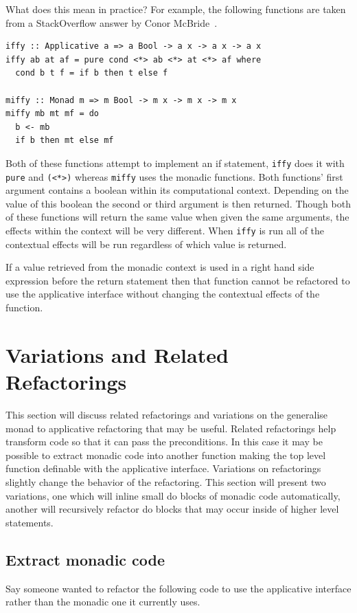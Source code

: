 What does this mean in practice? For example, the following functions are taken from a StackOverflow answer by Conor McBride~\citep{soApp}.

\begin{lstlisting}[frame=tblr]
iffy :: Applicative a => a Bool -> a x -> a x -> a x
iffy ab at af = pure cond <*> ab <*> at <*> af where
  cond b t f = if b then t else f

miffy :: Monad m => m Bool -> m x -> m x -> m x
miffy mb mt mf = do
  b <- mb
  if b then mt else mf
\end{lstlisting} 

Both of these functions attempt to implement an if statement, \texttt{iffy} does it with \texttt{pure} and \texttt{(<*>)} whereas \texttt{miffy} uses the monadic functions. Both functions' first argument contains a boolean within its computational context. Depending on the value of this boolean the second or third argument is then returned. Though both of these functions will return the same value when given the same arguments, the effects within the context will be very different. When \texttt{iffy} is run all of the contextual effects will be run regardless of which value is returned.

If a value retrieved from the monadic context is used in a right hand side expression before the return statement then that function cannot be refactored to use the applicative interface without changing the contextual effects of the function. 

\section{Variations and Related Refactorings}
\label{sec:appVariations}

This section will discuss related refactorings and variations on the generalise monad to applicative refactoring that may be useful. Related refactorings help transform code so that it can pass the preconditions. In this case it may be possible to extract monadic code into another function making the top level function definable with the applicative interface. Variations on refactorings slightly change the behavior of the refactoring. This section will present two variations, one which will inline small do blocks of monadic code automatically, another will
recursively refactor do blocks that may occur inside of higher level statements.

\subsection{Extract monadic code}
\label{subSec:extract}
Say someone wanted to refactor the following code to use the applicative interface rather than the monadic one it currently uses.

